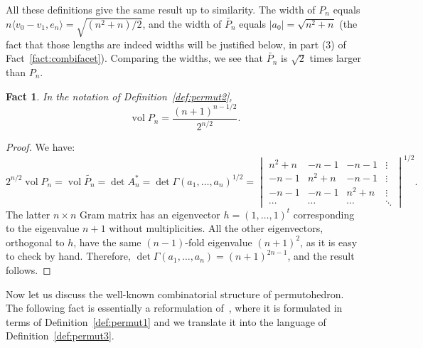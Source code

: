 \documentclass[12pt,a4paper,oneside]{amsart}
\newtheorem{fact}[theorem]{Fact}
\theoremstyle{definition}
\theoremstyle{remark}
\numberwithin{equation}{section}
\DeclareMathOperator{\volu}{vol}
\begin{document}
All these definitions give the same result up to similarity. The width of $P_n$ equals $n \langle v_0-v_1, e_n\rangle = \sqrt{(n^2+n)/2}$, and the width of $\widetilde{P_n}$ equals $|a_0| = \sqrt{n^2+n}$ (the fact that those lengths are indeed widths will be justified below, in part (3) of Fact~\ref{fact:combifacet}). Comparing the widths, we see that $\widetilde{P_n}$ is $\sqrt{2}$ times larger than $P_n$.

\begin{fact}
\label{fact:volume}
In the notation of Definition~\ref{def:permut2},
$$
\volu P_n = \frac{(n+1)^{n-1/2}}{2^{n/2}}.
$$
\end{fact}

\begin{proof}

We have:
$$
 2^{n/2} \volu P_n = \volu \widetilde{P_n} = \det A_n^* = \det \Gamma(a_1, \ldots, a_n)^{1/2} =
 \begin{vmatrix}
  n^2 + n & -n-1 & -n-1 & \vdots \\
 -n-1 & n^2+n & -n-1 & \vdots\\
 -n-1 & -n-1 & n^2+n & \vdots \\
 \cdots & \cdots & \cdots & \ddots
 \end{vmatrix}^{1/2}.
$$
The latter $n\times n$ Gram matrix has an eigenvector $h = (1, \ldots, 1)^t$ corresponding to the eigenvalue $n+1$ without multiplicities. All the other eigenvectors, orthogonal to $h$, have the same $(n-1)$-fold eigenvalue $(n+1)^2$, as it is easy to check by hand. Therefore, $\det \Gamma(a_1, \ldots, a_n) = (n+1)^{2n-1}$, and the result follows.
\end{proof}

Now let us discuss the well-known combinatorial structure of permutohedron. The following fact is essentially a reformulation of~\cite[Proposition~2.6]{postnikov2009permutohedra}, where it is formulated in terms of Definition~\ref{def:permut1} and we translate it into the language of Definition~\ref{def:permut3}.
\end{document}
